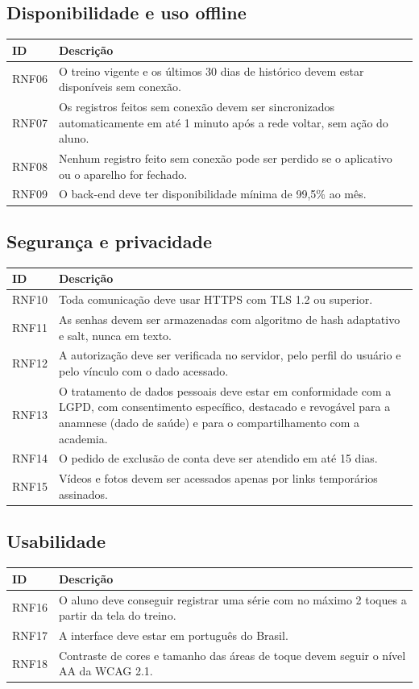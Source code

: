 \subsection{Disponibilidade e uso offline}
\begin{tabularx}{\textwidth}{@{}l L@{}}
  \toprule
  \textbf{ID} & \textbf{Descrição} \\
  \midrule
  RNF06 & O treino vigente e os últimos 30 dias de histórico devem estar disponíveis sem conexão. \\
  RNF07 & Os registros feitos sem conexão devem ser sincronizados automaticamente em até 1 minuto após a rede voltar, sem ação do aluno. \\
  RNF08 & Nenhum registro feito sem conexão pode ser perdido se o aplicativo ou o aparelho for fechado. \\
  RNF09 & O back-end deve ter disponibilidade mínima de 99,5\% ao mês. \\
  \bottomrule
\end{tabularx}

\subsection{Segurança e privacidade}
\begin{tabularx}{\textwidth}{@{}l L@{}}
  \toprule
  \textbf{ID} & \textbf{Descrição} \\
  \midrule
  RNF10 & Toda comunicação deve usar HTTPS com TLS 1.2 ou superior. \\
  RNF11 & As senhas devem ser armazenadas com algoritmo de hash adaptativo e salt, nunca em texto. \\
  RNF12 & A autorização deve ser verificada no servidor, pelo perfil do usuário e pelo vínculo com o dado acessado. \\
  RNF13 & O tratamento de dados pessoais deve estar em conformidade com a LGPD, com consentimento específico, destacado e revogável para a anamnese (dado de saúde) e para o compartilhamento com a academia. \\
  RNF14 & O pedido de exclusão de conta deve ser atendido em até 15 dias. \\
  RNF15 & Vídeos e fotos devem ser acessados apenas por links temporários assinados. \\
  \bottomrule
\end{tabularx}

\subsection{Usabilidade}
\begin{tabularx}{\textwidth}{@{}l L@{}}
  \toprule
  \textbf{ID} & \textbf{Descrição} \\
  \midrule
  RNF16 & O aluno deve conseguir registrar uma série com no máximo 2 toques a partir da tela do treino. \\
  RNF17 & A interface deve estar em português do Brasil. \\
  RNF18 & Contraste de cores e tamanho das áreas de toque devem seguir o nível AA da WCAG 2.1. \\
  \bottomrule
\end{tabularx}

